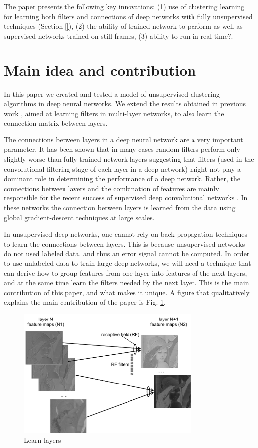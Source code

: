 \documentclass{article} %
\begin{document}
The paper presents the following key innovations: (1) use of clustering learning for learning both filters and connections of deep networks with fully unsupervised techniques (Section \ref{}), (2) the ability of trained network to perform as well as supervised networks trained on still frames, (3) ability to run in real-time?. 



\section{Main idea and contribution}
\label{sec-main}

In this paper we created and tested a model of unsupervised clustering algorithms in deep neural networks. We extend the results obtained in previous work \cite{culurciello2013clustering}, aimed at learning filters in multi-layer networks, to also learn the connection matrix between layers. 

The connections between layers in a deep neural network are a very important parameter. It has been shown that in many cases random filters perform only slightly worse than fully trained network layers \cite{saxe2011random} suggesting that filters (used in the convolutional filtering stage of each layer in a deep network) might not play a dominant role in determining the performance of a deep network.
Rather, the connections between layers and the combination of features are mainly responsible for the recent success of supervised deep convolutional networks \cite{krizhevsky_imagenet_2012}. In these networks the connection between layers is learned from the data using global gradient-descent techniques at large scales.
 
In unsupervised deep networks, one cannot rely on back-propagation techniques to learn the connections between layers. This is because unsupervised networks do not used labeled data, and thus an error signal cannot be computed.
In order to use unlabeled data to train large deep networks, we will need a technique that can derive how to group features from one layer into features of the next layers, and at the same time learn the filters needed by the next layer.
This is the main contribution of this paper, and what makes it unique. A figure that qualitatively explains the main contribution of the paper is Fig. \ref{fig-learnlayers}.

\begin{figure}
\includegraphics[width=3.5in]{fig-learnlayers.pdf}
\caption{Learn layers}
\label{fig-learnlayers}
\end{figure}
\end{document}
